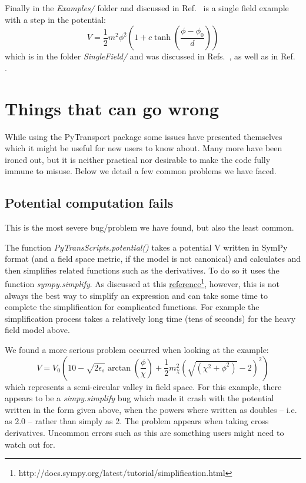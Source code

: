 \documentclass[10pt,
amsmath,amssymb,
aps,prd,nofootinbib,eqsecnum,a4paper]{revtex4}
\def\be{\begin{equation}}
\def\ee{\end{equation}}
\begin{document}
Finally in the {\it Examples/} folder and discussed in  Ref.~\cite{xxx} is a single field example with a step in the potential:
\be
V = \frac{1}{2} m^2 \phi^2 \left (1+c \tanh\left(\frac{\phi-\phi_0}{d} \right)\right)
\ee
which is in the folder {\it SingleField/} and was discussed in Refs.~\cite{Chen:2006xjb,Chen:2008wn}, as well as in Ref.~\cite{xxx} .


\section{Things that can go wrong}

While using the PyTransport package some issues have presented themselves which it might be useful 
for new users to know about. Many more have been ironed out, but it is neither practical nor desirable to make the code 
fully immune to misuse. Below we detail a few common problems we have faced. 


\subsection{Potential computation fails}
\label{pcf}
This is the most severe bug/problem we have found, but also the least common. 

The function {\it PyTransScripts.potential()} takes a potential V written in SymPy format (and a field 
space metric, if the model is not canonical) and 
calculates and then simplifies related functions such as the derivatives. To do so it uses the function {\it sympy.simplify}. 
As discussed at 
this \href{http://docs.sympy.org/latest/tutorial/simplification.html}{reference}\footnote{http://docs.sympy.org/latest/tutorial/simplification.html}, however, this is not always 
the best way to simplify an expression and can take some time to complete the simplification 
for complicated functions. For example the simplification process takes a relatively long time (tens of seconds) for the heavy 
field model 
above.

We found a more serious problem occurred when looking at the example:
\be
V = V_0 \left (10 - \sqrt {2 \epsilon_s} \arctan \left ( \frac{\phi}{\chi} \right ) +    \frac{1}{2} m_\chi^2 
\left ( \sqrt {\left (\chi^2 + \phi^2 \right )} - 2 \right )^2 \right)
\ee
which represents a semi-circular valley in field space.
For this example, there appears to be a 
{\it simpy.simplify} bug which made it crash with 
the potential written in the form given above, when the powers where written as doubles -- i.e. as 2.0 -- rather than simply as 
2. The problem appears when taking cross derivatives. 
Uncommon errors such as this are something users might need to watch out for. 
\end{document}
